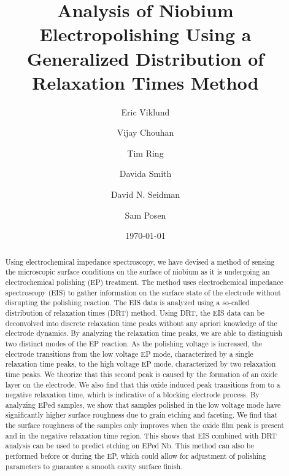 \documentclass{revtex4-2}
\begin{document}
\title{Analysis of Niobium Electropolishing Using a Generalized Distribution of Relaxation Times Method}
\author{Eric Viklund}%
%
%
\author{Vijay Chouhan}%
%
\author{Tim Ring}%
%
\author{Davida Smith}%
%
\author{David N. Seidman}%
%
\author{Sam Posen}%
%
\date{\today}

\begin{abstract}
  Using electrochemical impedance spectroscopy, we have devised a method of sensing the microscopic surface conditions on the surface of niobium as it is undergoing an electrochemical polishing (EP) treatment. The method uses electrochemical impedance spectroscopy (EIS) to gather information on the surface state of the electrode without disrupting the polishing reaction. The EIS data is analyzed using a so-called distribution of relaxation times (DRT) method. Using DRT, the EIS data can be deconvolved into discrete relaxation time peaks without any apriori knowledge of the electrode dynamics. By analyzing the relaxation time peaks, we are able to distinguish two distinct modes of the EP reaction. As the polishing voltage is increased, the electrode transitions from the low voltage EP mode, characterized by a single relaxation time peaks, to the high voltage EP mode, characterized by two relaxation time peaks. We theorize that this second peak is caused by the formation of an oxide layer on the electrode. We also find that this oxide induced peak transitions from to a negative relaxation time, which is indicative of a blocking electrode process. By analyzing EPed samples, we show that samples polished in the low voltage mode have significantly higher surface roughness due to grain etching and faceting. We find that the surface roughness of the samples only improves when the oxide film peak is present and in the negative relaxation time region. This shows that EIS combined with DRT analysis can be used to predict etching on EPed Nb. This method can also be performed before or during the EP, which could allow for adjustment of polishing parameters to guarantee a smooth cavity surface finish.
\end{abstract}
\end{document}

